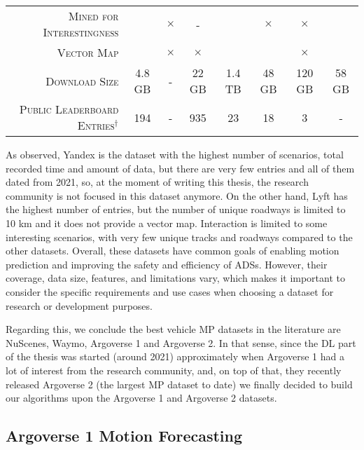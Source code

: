 \begin{table}[!tpbh]
\begin{adjustbox}{max width=\columnwidth}
\begin{tabular}{rccccccc}
			\textsc{Mined for Interestingness} & \checkmark & $\times$ & - & \checkmark & $\times$ & $\times$ & \checkmark \\
			\textsc{Vector Map} & \checkmark & $\times$ & $\times$ & \checkmark & \checkmark & $\times$ &\checkmark \\
			\textsc{Download Size} & 4.8 GB  & -  & 22 GB  & 1.4 TB  & 48 GB & 120 GB & 58 GB \\
			\textsc{Public Leaderboard Entries}$^\dagger$ & 194  & -  & 935  & 23 & 18 & 3 & - \\
			\bottomrule
		\end{tabular}
		\endgroup
	\end{adjustbox}
\end{table}

As observed, Yandex is the dataset with the highest number of scenarios, total recorded time and amount of data, but there are very few entries and all of them dated from 2021, so, at the moment of writing this thesis, the research community is not focused in this dataset anymore. On the other hand, Lyft has the highest number of entries, but the number of unique roadways is limited to 10 km and it does not provide a vector map. Interaction is limited to some interesting scenarios, with very few unique tracks and roadways compared to the other datasets. Overall, these datasets have common goals of enabling motion prediction and improving the safety and efficiency of \acp{ADS}. However, their coverage, data size, features, and limitations vary, which makes it important to consider the specific requirements and use cases when choosing a dataset for research or development purposes. 

Regarding this, we conclude the best vehicle \ac{MP} datasets in the literature are NuScenes, Waymo, Argoverse 1 and Argoverse 2. In that sense, since the \ac{DL} part of the thesis was started (around 2021) approximately when Argoverse 1 had a lot of interest from the research community, and, on top of that, they recently released Argoverse 2 (the largest \ac{MP} dataset to date) we finally decided to build our algorithms upon the Argoverse 1 and Argoverse 2 datasets.

\subsection{Argoverse 1 Motion Forecasting}
\label{subsec:2_argoverse_1}

